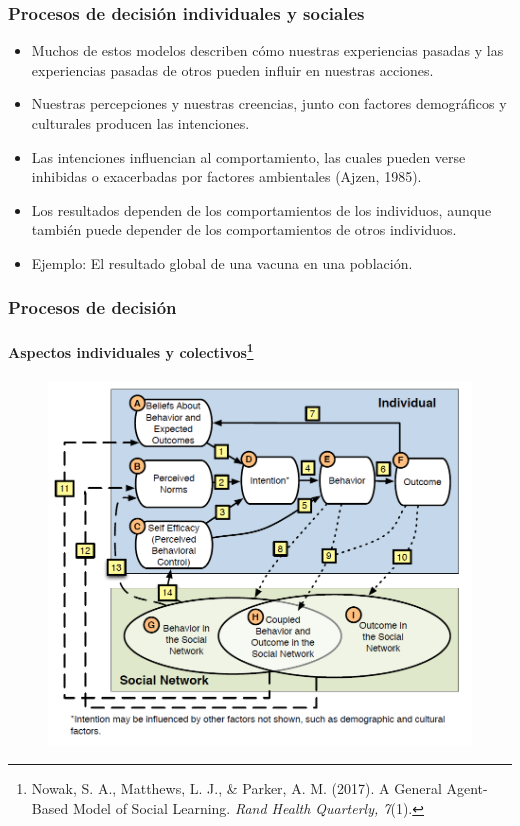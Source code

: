 \documentclass[11pt]{beamer}
\begin{document}
\begin{frame}
	\frametitle{Procesos de decisión individuales y sociales}
	\begin{itemize}
		\item Muchos de estos modelos describen cómo nuestras experiencias pasadas y las experiencias pasadas de otros pueden influir en nuestras acciones.
		\item Nuestras percepciones y nuestras creencias, junto con factores demográficos y culturales producen las intenciones.
		\item Las intenciones influencian al comportamiento, las cuales pueden verse inhibidas o exacerbadas por factores ambientales (Ajzen, 1985).
		\item Los resultados dependen de los comportamientos de los individuos, aunque también puede depender de los comportamientos de otros individuos. 
		\item Ejemplo: El resultado global de una vacuna en una población.
	\end{itemize}
\end{frame}

\begin{frame}
	\frametitle{Procesos de decisión}
	\framesubtitle{Aspectos individuales y colectivos\footnote{{\scriptsize Nowak, S. A., Matthews, L. J., \& Parker, A. M. (2017). A General Agent-Based Model of Social Learning. \textit{Rand Health Quarterly, 7}(1).}}}
	\begin{figure}
		\centering
		\includegraphics[width=0.7\linewidth]{figuras/influencia.png}
		\label{fig:influencia}
	\end{figure}
	
\end{frame}
\end{document}
